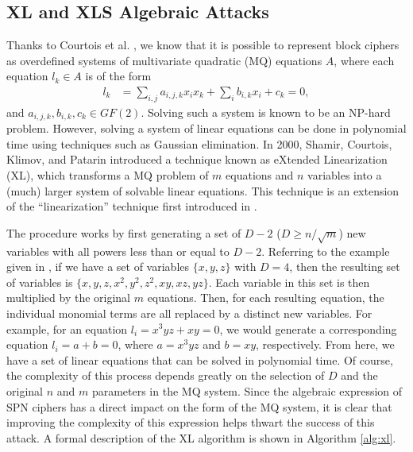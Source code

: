
\subsection{XL and XLS Algebraic Attacks}
Thanks to Courtois et al. \cite{Courtois00-1}, we know that it is possible to represent block ciphers as overdefined systems of multivariate quadratic (MQ) equations $A$, where each equation $l_k \in A$ is of the form
\begin{align*}
l_k & = \sum_{i,j}a_{i,j,k}x_ix_k + \sum_{i}b_{i,k}x_i + c_k = 0,
\end{align*}
and $a_{i,j,k},b_{i,k},c_k \in GF(2)$. Solving such a system is known to be an NP-hard \cite{Fraenkel79-1} problem. However, solving a system of linear equations can be done in polynomial time using techniques such as Gaussian elimination. In 2000, Shamir, Courtois, Klimov, and Patarin \cite{Courtois00-1} introduced a technique known as eXtended Linearization (XL), which transforms a MQ problem of $m$ equations and $n$ variables into a (much) larger system of solvable linear equations. This technique is an extension of the ``linearization'' technique first introduced in \cite{Kipnis99-1}.

The procedure works by first generating a set of $D - 2$ ($D \geq n/\sqrt{m}$) new variables with all powers less than or equal to $D - 2$. Referring to the example given in \cite{Kleiman05-1}, if we have a set of variables $\{x, y, z\}$ with $D = 4$, then the resulting set of variables is $\{x,y,z,x^2,y^2,z^2,xy,xz,yz\}$. Each variable in this set is then multiplied by the original $m$ equations. Then, for each resulting equation, the individual monomial terms are all replaced by a distinct new variables. For example, for an equation $l_i = x^3yz + xy = 0$, we would generate a corresponding equation $l_i = a + b = 0$, where $a = x^3yz$ and $b = xy$, respectively. From here, we have a set of linear equations that can be solved in polynomial time. Of course, the complexity of this process depends greatly on the selection of $D$ and the original $n$ and $m$ parameters in the MQ system. Since the algebraic expression of SPN ciphers has a direct impact on the form of the MQ system, it is clear that improving the complexity of this expression helps thwart the success of this attack. A formal description of the XL algorithm is shown in Algorithm \ref{alg:xl}.

